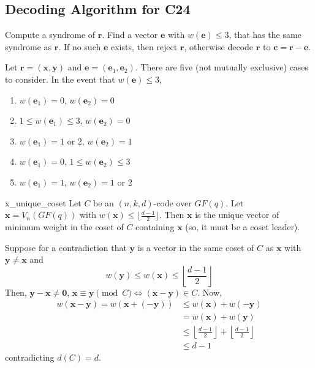 \subsection*{Decoding Algorithm for C24}
Compute a syndrome of $ \symbf{r} $. Find a vector $ \symbf{e} $ with $ w(\symbf{e})\leqslant 3 $,
that has the same syndrome as $ \symbf{r} $. If no such $ \symbf{e} $ exists, then
reject $ \symbf{r} $, otherwise decode $ \symbf{r} $ to $ \symbf{c}=\symbf{r}-\symbf{e} $.

Let $ \symbf{r}=(\symbf{x},\symbf{y}) $ and $ \symbf{e}=(\symbf{e}_1,\symbf{e}_2) $.
There are five (not mutually exclusive) cases to consider. In the event that
$ w(\symbf{e})\leqslant 3 $,
\begin{enumerate}[label=(\Alph*)]
    \item $ w(\symbf{e}_1)=0 $, $ w(\symbf{e}_2)=0 $
    \item $ 1\leqslant w(\symbf{e}_1)\leqslant 3 $, $ w(\symbf{e}_2)=0 $
    \item $ w(\symbf{e}_1)=1 $ or $ 2 $, $ w(\symbf{e}_2)=1 $
    \item $ w(\symbf{e}_1)=0 $, $ 1\leqslant w(\symbf{e}_2)\leqslant 3 $
    \item $ w(\symbf{e}_1)=1 $, $ w(\symbf{e}_2)=1 $ or $ 2 $
\end{enumerate}

\begin{Theorem}{}{x_unique_coset}
    Let $ C $ be an $ (n,k,d) $-code over $ GF(q) $. Let $ \symbf{x}=
        V_n(GF(q)) $ with $ w(\symbf{x})\leqslant \lfloor \frac{d-1}{2} \rfloor $.
    Then $ \symbf{x} $ is the unique vector of minimum weight in the coset
    of $ C $ containing $ \symbf{x} $ (so, it must be a coset leader).
\end{Theorem}

\begin{Proof}{}{}
    Suppose for a contradiction that
    $ \symbf{y} $ is a vector in the same coset of $ C $ as $ \symbf{x} $
    with $ \symbf{y}\neq \symbf{x} $ and
    \[ w(\symbf{y})\leqslant w(\symbf{x})\leqslant \left\lfloor \frac{d-1}{2} \right\rfloor \]
    Then, $ \symbf{y}-\symbf{x}\neq \symbf{0} $, $ \symbf{x}\equiv \symbf{y}\pmod{C} \iff
        (\symbf{x}-\symbf{y})\in C $. Now,
    \begin{align*}
        w(\symbf{x}-\symbf{y})=w(\symbf{x}+(-\symbf{y}))
         & \leqslant w(\symbf{x})+w(-\symbf{y})                                                          \\
         & =w(\symbf{x})+w(\symbf{y})                                                                    \\
         & \leqslant \left\lfloor \frac{d-1}{2} \right\rfloor + \left\lfloor \frac{d-1}{2} \right\rfloor \\
         & \leqslant d-1
    \end{align*}
    contradicting $ d(C)=d $.
\end{Proof}
